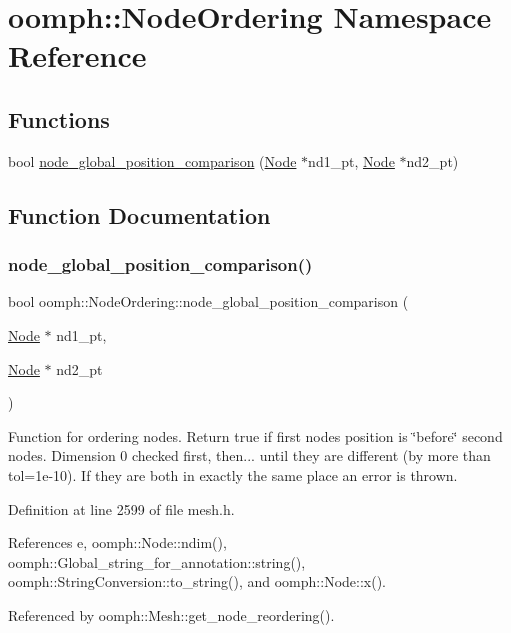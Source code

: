 \hypertarget{namespaceoomph_1_1NodeOrdering}{}\section{oomph\+:\+:Node\+Ordering Namespace Reference}
\label{namespaceoomph_1_1NodeOrdering}
\subsection*{Functions}
\begin{DoxyCompactItemize}
\item 
bool \hyperlink{namespaceoomph_1_1NodeOrdering_ab4b56433bc36410fa77a0038a0996ecb}{node\+\_\+global\+\_\+position\+\_\+comparison} (\hyperlink{classoomph_1_1Node}{Node} $\ast$nd1\+\_\+pt, \hyperlink{classoomph_1_1Node}{Node} $\ast$nd2\+\_\+pt)
\end{DoxyCompactItemize}


\subsection{Function Documentation}
\mbox{\label{namespaceoomph_1_1NodeOrdering_ab4b56433bc36410fa77a0038a0996ecb}} 
\subsubsection{\texorpdfstring{node\+\_\+global\+\_\+position\+\_\+comparison()}{node\_global\_position\_comparison()}}
{\footnotesize\ttfamily bool oomph\+::\+Node\+Ordering\+::node\+\_\+global\+\_\+position\+\_\+comparison (\begin{DoxyParamCaption}\item[{\hyperlink{classoomph_1_1Node}{Node} $\ast$}]{nd1\+\_\+pt,  }\item[{\hyperlink{classoomph_1_1Node}{Node} $\ast$}]{nd2\+\_\+pt }\end{DoxyParamCaption})\hspace{0.3cm}{\ttfamily [inline]}}

Function for ordering nodes. Return true if first node\textquotesingle{}s position is \char`\"{}before\char`\"{} second nodes. Dimension 0 checked first, then... until they are different (by more than tol=1e-\/10). If they are both in exactly the same place an error is thrown. 

Definition at line 2599 of file mesh.\+h.



References e, oomph\+::\+Node\+::ndim(), oomph\+::\+Global\+\_\+string\+\_\+for\+\_\+annotation\+::string(), oomph\+::\+String\+Conversion\+::to\+\_\+string(), and oomph\+::\+Node\+::x().



Referenced by oomph\+::\+Mesh\+::get\+\_\+node\+\_\+reordering().

